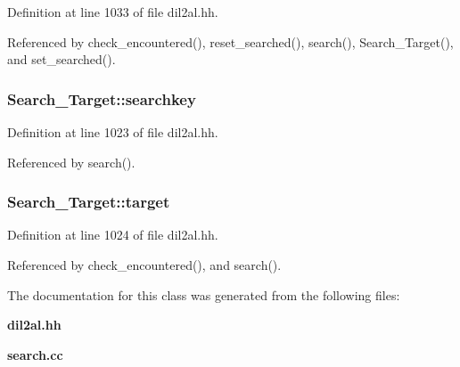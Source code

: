 Definition at line 1033 of file dil2al.hh.

Referenced by check\_\-encountered(), reset\_\-searched(), search(), Search\_\-Target(), and set\_\-searched().
\subsubsection{ Search\_\-Target::searchkey\hspace{0.3cm}{\tt  [protected]}}\label{classSearch__Target_n1}




Definition at line 1023 of file dil2al.hh.

Referenced by search().
\subsubsection{ Search\_\-Target::target\hspace{0.3cm}{\tt  [protected]}}\label{classSearch__Target_n2}




Definition at line 1024 of file dil2al.hh.

Referenced by check\_\-encountered(), and search().

The documentation for this class was generated from the following files:\begin{CompactItemize}
\item 
{\bf dil2al.hh}\item 
{\bf search.cc}\end{CompactItemize}
